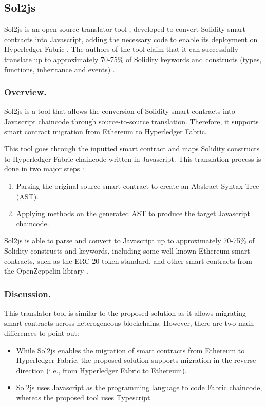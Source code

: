 \documentclass[runningheads]{llncs}
\begin{document}
\subsection{Sol2js} \label{sol2js}
Sol2js \cite{sol2js} is an open source translator tool \cite{solidity2chaincode}, developed to convert Solidity smart contracts into Javascript, adding the necessary code to enable its deployment on Hyperledger Fabric \cite{sol2js}. The authors of the tool claim that it can successfully translate up to approximately 70-75\% of Solidity keywords and constructs (types, functions, inheritance and events) \cite{solidity2chaincode}.

\subsubsection{Overview.}
Sol2js is a tool that allows the conversion of Solidity smart contracts into Javascript chaincode through source-to-source translation. Therefore, it supports smart contract migration from Ethereum to Hyperledger Fabric.

This tool goes through the inputted smart contract and maps Solidity constructs to Hyperledger Fabric chaincode written in Javascript. This translation process is done in two major steps \cite{sol2js}:
\begin{enumerate}
    \item Parsing the original source smart contract to create an Abstract Syntax Tree (AST).
    \item Applying methods on the generated AST to produce the target Javascript chaincode.
\end{enumerate}

Sol2js is able to parse and convert to Javascript up to approximately 70-75\% of Solidity constructs and keywords, including some well-known Ethereum smart contracts, such as the ERC-20 token standard, and other smart contracts from the OpenZeppelin library \cite{openzeppelin}.

\subsubsection{Discussion.}
This translator tool is similar to the proposed solution as it allows migrating smart contracts across heterogeneous blockchains. However, there are two main differences to point out:
\begin{itemize}
    \item While Sol2js enables the migration of smart contracts from Ethereum to Hyperledger Fabric, the proposed solution supports migration in the reverse direction (i.e., from Hyperledger Fabric to Ethereum).
    \item Sol2js uses Javascript as the programming language to code Fabric chaincode, whereas the proposed tool uses Typescript.
\end{itemize}
\end{document}
